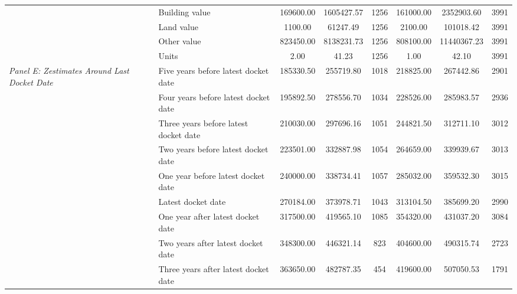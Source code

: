 \begin{tabular}{llcccccc}
 & Building value & 169600.00 & 1605427.57 & 1256 & 161000.00 & 2352903.60 & 3991 \\
 & Land value & 1100.00 & 61247.49 & 1256 & 2100.00 & 101018.42 & 3991 \\
 & Other value & 823450.00 & 8138231.73 & 1256 & 808100.00 & 11440367.23 & 3991 \\
 & Units & 2.00 & 41.23 & 1256 & 1.00 & 42.10 & 3991 \\
\cline{1-8}
\multirow[c]{9}{4cm}{\textit{Panel E: Zestimates Around Last Docket Date}} & Five years before latest docket date & 185330.50 & 255719.80 & 1018 & 218825.00 & 267442.86 & 2901 \\
 & Four years before latest docket date & 195892.50 & 278556.70 & 1034 & 228526.00 & 285983.57 & 2936 \\
 & Three years before latest docket date & 210030.00 & 297696.16 & 1051 & 244821.50 & 312711.10 & 3012 \\
 & Two years before latest docket date & 223501.00 & 332887.98 & 1054 & 264659.00 & 339939.67 & 3013 \\
 & One year before latest docket date & 240000.00 & 338734.41 & 1057 & 285032.00 & 359532.30 & 3015 \\
 & Latest docket date & 270184.00 & 373978.71 & 1043 & 313104.50 & 385699.20 & 2990 \\
 & One year after latest docket date & 317500.00 & 419565.10 & 1085 & 354320.00 & 431037.20 & 3084 \\
 & Two years after latest docket date & 348300.00 & 446321.14 & 823 & 404600.00 & 490315.74 & 2723 \\
 & Three years after latest docket date & 363650.00 & 482787.35 & 454 & 419600.00 & 507050.53 & 1791 \\
\cline{1-8}
\bottomrule
\end{tabular}
